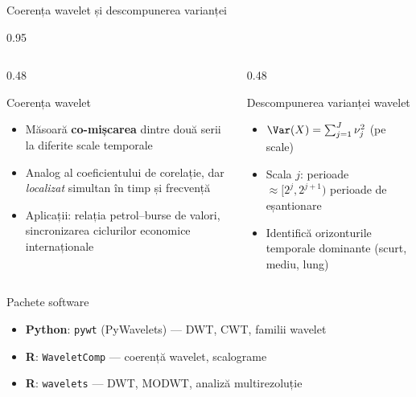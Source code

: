 \documentclass[9pt, aspectratio=169, t]{beamer}
\begin{document}
\begin{frame}{Coerența wavelet și descompunerea varianței}
    \begin{cminipage}{0.95\textwidth}
        \vspace{-0.2cm}
        {\footnotesize
        \begin{columns}[T]
            \begin{column}{0.48\textwidth}
                \begin{block}{Coerența wavelet}
                    \begin{itemize}\setlength{\itemsep}{0pt}
                        \item Măsoară \textbf{co-mișcarea} dintre două serii la diferite scale temporale
                        \item Analog al coeficientului de corelație, dar \textit{localizat} simultan în timp și frecvență
                        \item Aplicații: relația petrol--burse de valori, sincronizarea ciclurilor economice internaționale
                    \end{itemize}
                \end{block}
            \end{column}
            \begin{column}{0.48\textwidth}
                \begin{exampleblock}{Descompunerea varianței wavelet}
                    \begin{itemize}\setlength{\itemsep}{0pt}
                        \item $\Var(X) = \sum_{j=1}^{J} \nu_j^2$ (pe scale)
                        \item Scala $j$: perioade $\approx [2^{j}, 2^{j+1})$ perioade de eșantionare
                        \item Identifică orizonturile temporale dominante (scurt, mediu, lung)
                    \end{itemize}
                \end{exampleblock}
            \end{column}
        \end{columns}
        }
        \vspace{-1mm}
        {\footnotesize
        \begin{block}{Pachete software}
            \begin{itemize}\setlength{\itemsep}{0pt}
                \item \textbf{Python}: \texttt{pywt} (PyWavelets) --- DWT, CWT, familii wavelet
                \item \textbf{R}: \texttt{WaveletComp} --- coerență wavelet, scalograme
                \item \textbf{R}: \texttt{wavelets} --- DWT, MODWT, analiză multirezoluție
            \end{itemize}
        \end{block}
        }
        \hfill{}
    \end{cminipage}
\end{frame}
\end{document}

